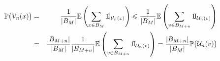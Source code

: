 \documentclass{article}
\newcommand{\E}{\mathbb{E}}
\newcommand{\Pb}{\mathbb{P}}
\newcommand{\I}{1\!{\rm I}}
\begin{document}
\begin{eqnarray*}
\Pb\big(\mathcal V_{n}(x)\big)
	& = &
\frac1{|B_M|} \E \left( \sum_{x\in B_M}  \I_{\mathcal V_{n}(x)} \right)
	\leqslant 	
\frac1{|B_M|} \E \left( \sum_{v \in B_{M+n}}  \I_{\mathcal U_{n}(v)} \right) \\
	& =				&
\frac{|B_{M+n}|}{|B_M|} \frac1{|B_{M+n}|} \E \left( \sum_{v \in B_{M+n}}  
								\I_{\mathcal U_{n}(v)} \right)
	= 
\frac{|B_{M+n}|}{|B_M|} \Pb\big(\mathcal U_{n}(v)\big)
\end{eqnarray*}
\end{document}
